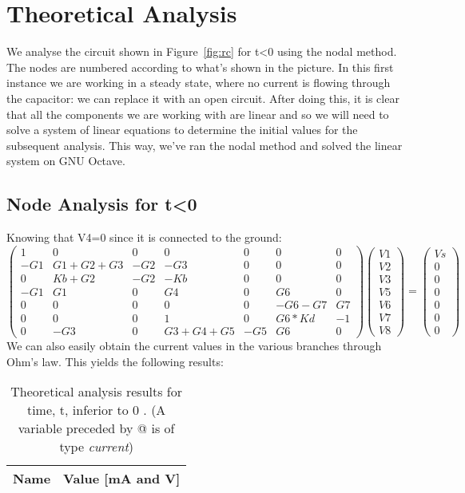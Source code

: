 \section{Theoretical Analysis}
\label{sec:analysis}

We analyse the circuit shown in Figure~\ref{fig:rc} for t<0 using the nodal method.
The nodes are numbered according to what's shown in the picture.
In this first instance we are working in a steady state, where no current is flowing through the capacitor: we can replace it with an open circuit.
After doing this, it is clear that all the components we are working with are linear and so we will need to solve a system of linear equations to determine the initial values for the subsequent analysis.
This way, we’ve ran the nodal method and solved the linear system on GNU Octave.
\subsection{Node Analysis for t<0}
Knowing that V4=0 since it is connected to the ground:
\begin{equation}
\begin{pmatrix}
1 & 0 & 0 & 0 & 0 & 0 & 0\\
-G1 & G1+G2+G3 & -G2 & -G3 & 0 & 0 & 0\\
0 & Kb+G2 & -G2 & -Kb & 0 & 0 & 0\\
-G1 & G1 & 0 & G4 & 0 & G6 & 0\\
0 & 0 & 0 & 0 & 0 & -G6-G7 & G7\\
0 & 0 & 0 & 1 & 0 & G6*Kd & -1\\
0 & -G3 & 0 & G3+G4+G5 & -G5 & G6 & 0
\end{pmatrix}
\begin{pmatrix}
V1\\
V2\\
V3\\
V5\\
V6\\
V7\\
V8
\end{pmatrix}
=
\begin{pmatrix}
Vs\\
0\\
0\\
0\\
0\\
0\\
0
\end{pmatrix}
\end{equation}
We can also easily obtain the current values in the various branches through Ohm's law. This yields the following results:
\begin{table}[h]
  \centering
  \begin{tabular}{|l|r|}
    \hline    
    {\bf Name} & {\bf Value [mA and V]} \\ \hline
     
  \end{tabular}
  \caption{Theoretical analysis results for time, t, inferior to 0 . (A variable preceded by @ is of type {\em current})}
  \label{tab:nodal}
\end{table}

